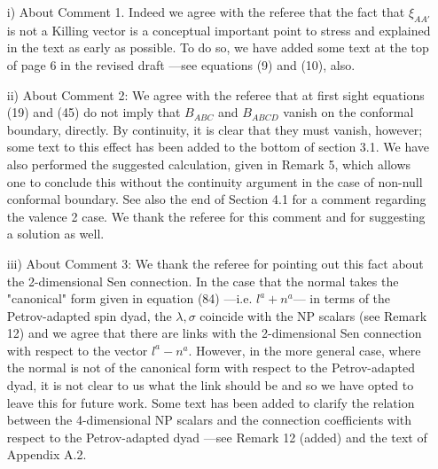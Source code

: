\documentclass[a4paper,10pt]{article}
\theoremstyle{plain}
\numberwithin{equation}{section}
\begin{document}
  \begin{itemize}

  \item[i)] About Comment 1. Indeed we agree with the referee that the
    fact that $\xi_{AA'}$ is not a Killing vector is a conceptual
    important point to stress and explained in the text as early as
    possible. To do so, we have added some text at the top of page 6 
    in the revised draft ---see equations (9) and (10), also.
  
     
  \item[ii)] About Comment 2: We agree with the referee that at
    first sight equations (19) and (45) do not imply that $B_{ABC}$
    and $B_{ABCD}$ vanish on the conformal boundary, directly. By
    continuity, it is clear that they must vanish, however; some text to this
    effect has been added to the bottom of section 3.1. We have also 
    performed the suggested calculation, given in Remark 5, which
    allows one to conclude this without the continuity argument in the 
    case of non-null conformal boundary. See also the end of Section 4.1
    for a comment regarding the valence 2 case.
     We thank the referee for this comment and for suggesting a solution as
    well. 

  \item[iii)] About Comment 3: We thank the referee for pointing out
    this fact about the 2-dimensional Sen connection. In the case that the
    normal takes the "canonical" form given in equation (84) ---i.e. $l^a+n^a$---
     in terms of the 
    Petrov-adapted spin dyad, the $\lambda, \sigma$ coincide with the NP 
    scalars (see Remark 12) and we agree that there are links with the 2-dimensional
    Sen connection with respect to the vector $l^a-n^a$. However, in the more general case, 
    where the normal is not of the canonical form with respect to the Petrov-adapted dyad, 
    it is not clear to us
     what the link should be and so we have
    opted to leave this for future work. Some text has been added to clarify
    the relation between the 4-dimensional NP scalars and the connection coefficients with respect
    to the Petrov-adapted dyad
     ---see Remark 12 (added) and the text of Appendix A.2.

    
  \end{itemize}
\end{document}
